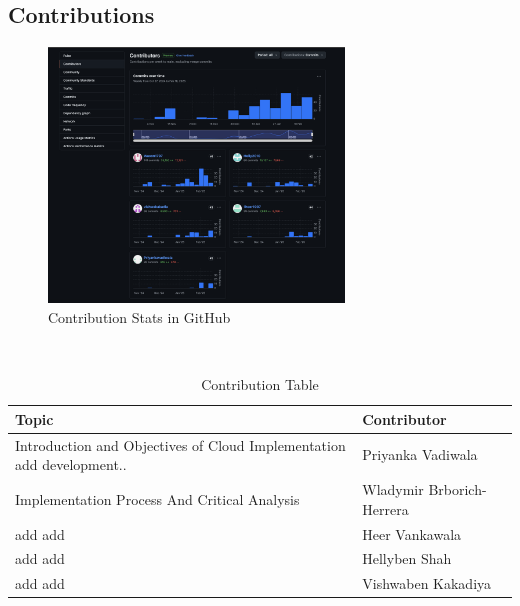 \documentclass{llncs}
\begin{document}
\subsection{Contributions}
\begin{figure}[htbp]
    \centering
    \includegraphics[width=0.7\textwidth]{../images/contributions.png}
    \vspace{0.01\textwidth}
    \caption{Contribution Stats in GitHub}
    \label{fig:contributions}
\end{figure}

\vphantom{}\\

\begin{table}[htbp]

    \begin{tabular}{|p{}|p{}|}
        \hline
        \textbf{Topic}    & \textbf{Contributor}      \\
        \hline
        Introduction and Objectives of Cloud Implementation  \newline
        add development.. & Priyanka Vadiwala         \\
        \hline
        Implementation Process  And Critical Analysis
                       & Wladymir Brborich-Herrera \\
        \hline
        add \newline
        add               & Heer Vankawala            \\
        \hline
        add \newline
        add               & Hellyben Shah             \\
        \hline
        add \newline
        add               & Vishwaben Kakadiya        \\
        \hline
    \end{tabular}
    \caption{Contribution Table}
    \label{tab:contribution}
\end{table}
\end{document}
